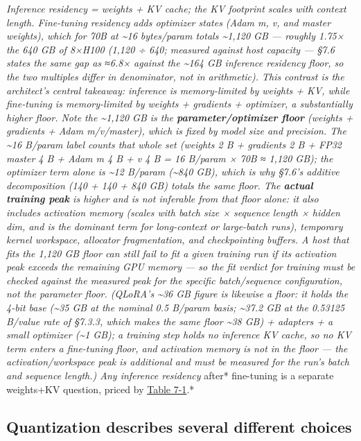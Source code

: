 \emph{Inference residency = weights + KV cache; the KV footprint scales
with context length. Fine-tuning residency adds optimizer states (Adam
m, v, and master weights), which for 70B at \textasciitilde16
bytes/param totals \textasciitilde1,120 GB --- roughly 1.75× the 640 GB
of 8×H100 (1,120 ÷ 640; measured against host capacity --- §7.6 states
the same gap as ≈6.8× against the \textasciitilde164 GB inference
residency floor, so the two multiples differ in denominator, not in
arithmetic). This contrast is the architect's central takeaway:
inference is memory-limited by weights + KV, while fine-tuning is
memory-limited by weights + gradients + optimizer, a substantially
higher floor. Note the \textasciitilde1,120 GB is the
\textbf{parameter/optimizer floor} (weights + gradients + Adam
m/v/master), which is fixed by model size and precision. The
\textasciitilde16 B/param label counts that whole set (weights 2 B +
gradients 2 B + FP32 master 4 B + Adam m 4 B + v 4 B = 16 B/param × 70B
≈ 1,120 GB); the optimizer term alone is \textasciitilde12 B/param
(\textasciitilde840 GB), which is why §7.6's additive decomposition (140
+ 140 + 840 GB) totals the same floor. The \textbf{actual training peak}
is higher and is not inferable from that floor alone: it also includes
activation memory (scales with batch size × sequence length × hidden
dim, and is the dominant term for long-context or large-batch runs),
temporary kernel workspace, allocator fragmentation, and checkpointing
buffers. A host that fits the 1,120 GB floor can still fail to fit a
given training run if its activation peak exceeds the remaining GPU
memory --- so the fit verdict for training must be checked against the
measured peak for the specific batch/sequence configuration, not the
parameter floor. (QLoRA's \textasciitilde36 GB figure is likewise a
floor: it holds the 4-bit base (\textasciitilde35 GB at the nominal 0.5
B/param basis; \textasciitilde37.2 GB at the 0.53125 B/value rate of
§7.3.3, which makes the same floor \textasciitilde38 GB) + adapters + a
small optimizer (\textasciitilde1 GB); a training step holds no
inference KV cache, so no KV term enters a fine-tuning floor, and
activation memory is not in the floor --- the activation/workspace peak
is additional and must be measured for the run's batch and sequence
length.) Any inference residency }after* fine-tuning is a separate
weights+KV question, priced by \hyperref[tab:7.1]{Table 7-1}.*

\subsection{Quantization describes several different
choices}\label{quantization-describes-several-different-choices}

